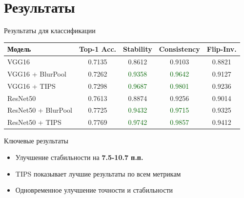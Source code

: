 \documentclass[aspectratio=169]{beamer}
\begin{document}
\section{Результаты}

\begin{frame}{Результаты для классификации}
    \begin{table}[h]
    \centering
    \small
    \begin{tabular}{|l|c|c|c|c|}
    \hline
    \textbf{Модель} & \textbf{Top-1 Acc.} & \textbf{Stability} & \textbf{Consistency} & \textbf{Flip-Inv.} \\
    \hline
    VGG16 & 0.7135 & 0.8612 & 0.9103 & 0.8821 \\
         VGG16 + BlurPool & 0.7262 & \textcolor{darkgreen}{0.9358} & \textcolor{darkgreen}{0.9642} & 0.9127 \\
     VGG16 + TIPS & 0.7298 & \textcolor{darkgreen}{0.9687} & \textcolor{darkgreen}{0.9801} & 0.9236 \\
    \hline
    ResNet50 & 0.7613 & 0.8874 & 0.9256 & 0.9014 \\
         ResNet50 + BlurPool & 0.7725 & \textcolor{darkgreen}{0.9432} & \textcolor{darkgreen}{0.9715} & 0.9325 \\
     ResNet50 + TIPS & 0.7769 & \textcolor{darkgreen}{0.9742} & \textcolor{darkgreen}{0.9857} & 0.9412 \\
    \hline
    \end{tabular}
    \end{table}
    
    \begin{block}{Ключевые результаты}
        \begin{itemize}
            \item Улучшение стабильности на \textbf{7.5-10.7 п.п.}
            \item TIPS показывает лучшие результаты по всем метрикам
            \item Одновременное улучшение точности и стабильности
        \end{itemize}
    \end{block}
\end{frame}
\end{document}
